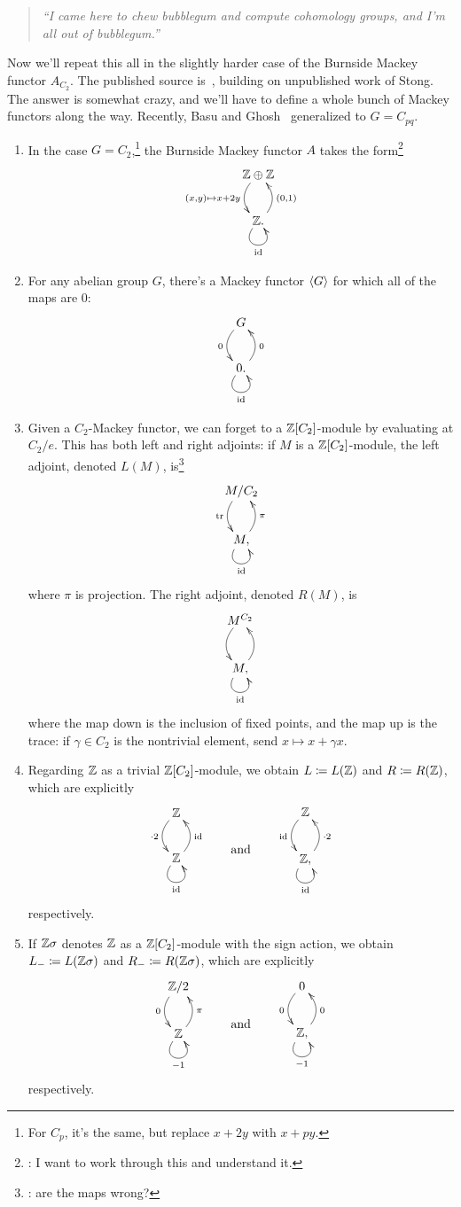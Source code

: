 \begin{quote}\textit{
	``I came here to chew bubblegum and compute cohomology groups, and I'm all out of bubblegum.''
}\end{quote}
Now we'll repeat this all in the slightly harder case of the Burnside Mackey functor $A_{C_2}$. The published
source is~\cite{Lew88}, building on unpublished work of Stong. The answer is somewhat crazy, and we'll have to
define a whole bunch of Mackey functors along the way. Recently, Basu and Ghosh~\cite{BasuGhosh} generalized to $G
= C_{pq}$.
\begin{beast}\hfill
\label{best_bestiary}
\begin{enumerate}
	\item In the case $G = C_2$,\footnote{For $C_p$, it's the same, but replace $x+2y$ with $x+py$.} the Burnside
	Mackey functor $A$ takes the form\footnote{\TODO: I want to work through this and understand
	it.}
	\begin{equation}
	\label{burnmack}
	\gathxy{
		\Z\oplus\Z\ar@/_0.4cm/[d]_{(x,y)\mapsto x+2y}\\
		\Z.\ar@(dl,dr)_\id\ar@/_0.4cm/[u]_{(0,1)}
	}
	\end{equation}
	\item For any abelian group $G$, there's a Mackey functor $\langle G\rangle$ for which all of the maps are $0$:
	\[\xymatrix{
		G\ar@/_0.4cm/[d]_0\\
		0.\ar@(dl,dr)_\id\ar@/_0.4cm/[u]_0
	}\]
	\item Given a $C_2$-Mackey functor, we can forget to a $\mathbb Z[C_2]$-module by evaluating at $C_2/e$. This has
	both left and right adjoints: if $M$ is a $\mathbb Z[C_2]$-module, the left adjoint, denoted $L(M)$, is\footnote{\TODO:
	are the maps wrong?}
	\[\xymatrix{
		M/C_2\ar@/_0.4cm/[d]_\tr\\
		M,\ar@(dl,dr)_\id\ar@/_0.4cm/[u]_\pi
	}\]
	where $\pi$ is projection. The right adjoint, denoted $R(M)$, is
	\[\xymatrix{
		M^{C_2}\ar@/_0.4cm/[d]\\
		M,\ar@(dl,dr)_\id\ar@/_0.4cm/[u]
	}\]
	where the map down is the inclusion of fixed points, and the map up is the trace: if $\gamma\in C_2$ is the
	nontrivial element, send $x\mapsto x+\gamma x$.
	\item Regarding $\mathbb Z$ as a trivial $\mathbb Z[C_2]$-module, we obtain $L\coloneqq L(\mathbb Z)$ and $R\coloneqq R(\mathbb Z)$, which
	are explicitly
	\[\gathxy{
		\Z\ar@/_0.4cm/[d]_{\cdot 2}\\
		\Z\ar@(dl,dr)_\id\ar@/_0.4cm/[u]_\id
	}\qquad\text{and}\qquad
	\gathxy{
		\Z\ar@/_0.4cm/[d]_\id\\
		\Z,\ar@(dl,dr)_\id\ar@/_0.4cm/[u]_{\cdot 2}
	}
	\]
	respectively.
	\item If $\mathbb Z\sigma$ denotes $\mathbb Z$ as a $\mathbb Z[C_2]$-module with the sign action, we obtain $L_-\coloneqq
	L(\mathbb Z\sigma)$ and $R_-\coloneqq R(\mathbb Z\sigma)$, which are explicitly
	\[\gathxy{
		\Z/2\ar@/_0.4cm/[d]_0\\
		\Z\ar@(dl,dr)_{-1}\ar@/_0.4cm/[u]_\pi
	}\qquad\text{and}\qquad
	\gathxy{
		0\ar@/_0.4cm/[d]_0\\
		\Z,\ar@(dl,dr)_{-1}\ar@/_0.4cm/[u]_0
	}
	\]
	respectively.
\end{enumerate}
\end{beast}
